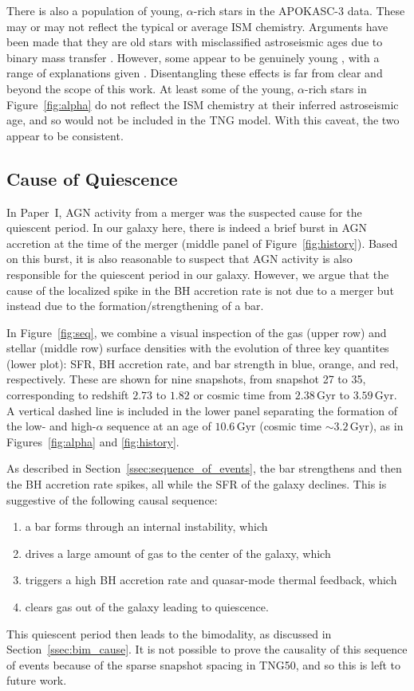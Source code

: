 \documentclass[twocolumn]{aastex631}
\newcommand{\Gyr}{\ensuremath{\textrm{Gyr}}}
\begin{document}
There is also a population of young, $\alpha$-rich stars in the APOKASC-3 data. These may or may not reflect the typical or average ISM chemistry. Arguments have been made that they are old stars with misclassified astroseismic ages due to binary mass transfer \citep[and references therein]{2023A&A...671A..21J}. However, some appear to be genuinely young \citep[and references therein]{2024arXiv241002962L}, with a range of explanations given \citep[e.g.][]{2015A&A...576L..12C,2021MNRAS.508.4484J,2023arXiv231105815S}. Disentangling these effects is far from clear and beyond the scope of this work. At least some of the young, $\alpha$-rich stars in Figure~\ref{fig:alpha} do not reflect the ISM chemistry at their inferred astroseismic age, and so would not be included in the TNG model. With this caveat, the two appear to be consistent.

\subsection{Cause of Quiescence}\label{ssec:cause_qui}
In Paper~I, AGN activity from a merger was the suspected cause for the quiescent period. In our galaxy here, there is indeed a brief burst in AGN accretion at the time of the merger (middle panel of Figure~\ref{fig:history}). Based on this burst, it is also reasonable to suspect that AGN activity is also responsible for the quiescent period in our galaxy. However, we argue that the cause of the localized spike in the BH accretion rate is not due to a merger but instead due to the formation/strengthening of a bar.

In Figure~\ref{fig:seq}, we combine a visual inspection of the gas (upper row) and stellar (middle row) surface densities with the evolution of three key quantites (lower plot): SFR, BH accretion rate, and bar strength in blue, orange, and red, respectively. These are shown for nine snapshots, from snapshot 27 to 35, corresponding to redshift $2.73$ to $1.82$ or cosmic time from $2.38\,\Gyr$ to $3.59\,\Gyr$. A vertical dashed line is included in the lower panel separating the formation of the low- and high-$\alpha$ sequence at an age of $10.6\,\Gyr$ (cosmic time $\sim3.2\,\Gyr$), as in Figures~\ref{fig:alpha} and \ref{fig:history}.

As described in Section~\ref{ssec:sequence_of_events}, the bar strengthens and then the BH accretion rate spikes, all while the SFR of the galaxy declines. This is suggestive of the following causal sequence:
\begin{enumerate}
  \item a bar forms through an internal instability, which
  \item drives a large amount of gas to the center of the galaxy, which
  \item triggers a high BH accretion rate and quasar-mode thermal feedback, which
  \item clears gas out of the galaxy leading to quiescence.
\end{enumerate}
This quiescent period then leads to the bimodality, as discussed in Section~\ref{ssec:bim_cause}. It is not possible to prove the causality of this sequence of events because of the sparse snapshot spacing in TNG50, and so this is left to future work.
\end{document}
